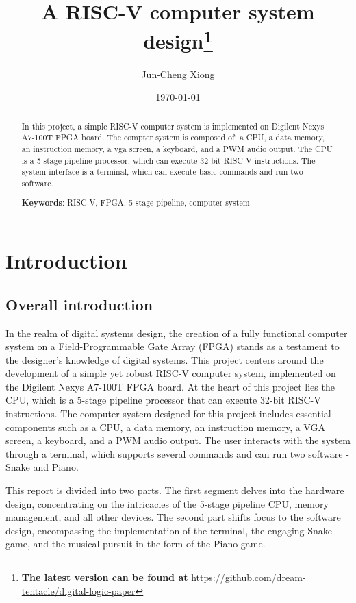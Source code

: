 \documentclass[
	a4paper, %
	11pt, %
]{CSUniSchoolLabReport}
\title{A RISC-V computer system design\thanks{\textbf{The latest version can be found at} \url{https://github.com/dream-tentacle/digital-logic-paper}}}
\author{Jun-Cheng Xiong} %
\date{\today} %
\begin{document}
\maketitle %


\begin{abstract}
    \large{
        In this project, a simple RISC-V computer system is implemented on Digilent Nexys A7-100T FPGA board. The compter system is composed of: a CPU, a data memory, an instruction memory, a vga screen, a keyboard, and a PWM audio output. The CPU is a 5-stage pipeline processor, which can execute 32-bit RISC-V instructions. The system interface is a terminal, which can execute basic commands and run two software.

        \textbf{Keywords}: RISC-V, FPGA, 5-stage pipeline, computer system
    }
\end{abstract}
\thispagestyle{empty}
\newpage

\thispagestyle{empty}
\tableofcontents

\newpage
\setcounter{page}{1}
\section{Introduction}
\subsection{Overall introduction}

In the realm of digital systems design, the creation of a fully functional computer system on a Field-Programmable Gate Array (FPGA) stands as a testament to the designer's knowledge of digital systems. This project centers around the development of a simple yet robust RISC-V computer system, implemented on the Digilent Nexys A7-100T FPGA board. At the heart of this project lies the CPU, which is a 5-stage pipeline processor that can execute 32-bit RISC-V instructions. The computer system designed for this project includes essential components such as a CPU, a data memory, an instruction memory, a VGA screen, a keyboard, and a PWM audio output. The user interacts with the system through a terminal, which supports several commands and can run two software - Snake and Piano.

This report is divided into two parts. The first segment delves into the hardware design, concentrating on the intricacies of the 5-stage pipeline CPU, memory management, and all other devices. The second part shifts focus to the software design, encompassing the implementation of the terminal, the engaging Snake game, and the musical pursuit in the form of the Piano game.
\end{document}
